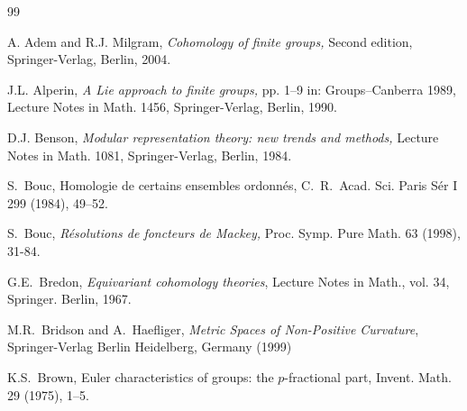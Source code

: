 \documentclass[12pt]{amsart}
\theoremstyle{plain}
\theoremstyle{definition}
\theoremstyle{remark}
\numberwithin{equation}{section}
\begin{document}
\begin{thebibliography}{99}

 A. Adem and R.J. Milgram, \textit{Cohomology of finite groups,} Second edition, Springer-Verlag, Berlin, 2004.

 J.L. Alperin, \textit{A Lie approach to finite groups,} pp. 1--9 in: Groups--Canberra 1989, Lecture Notes in Math. 1456,  Springer-Verlag, Berlin, 1990.


D.J. Benson, \textit{Modular representation theory: new trends and
methods,} Lecture Notes in Math. 1081,  Springer-Verlag, Berlin, 1984.


S.~Bouc, Homologie de certains ensembles ordonn\'es, C.~R.~Acad. Sci. Paris S\'er I 299 (1984), 49--52.

 S.~Bouc, {\sl R\'esolutions de foncteurs de
Mackey,} Proc. Symp. Pure Math. 63 (1998), 31-84.

G.E.~Bredon, \textit{Equivariant cohomology theories}, Lecture Notes in Math., vol. 34, Springer. Berlin, 1967.


M.R.~Bridson and A.~Haefliger, \textit{Metric Spaces of Non-Positive Curvature}, Springer-Verlag Berlin Heidelberg, Germany (1999)


K.S.~Brown, Euler characteristics of groups: the $p$-fractional part, Invent. Math. 29 (1975), 1--5.




\end{thebibliography}
\end{document}
